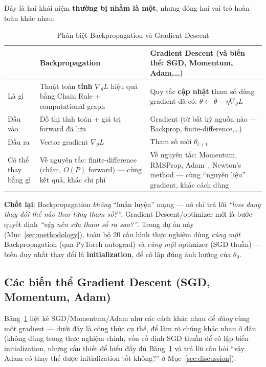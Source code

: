 \documentclass[12pt,a4paper]{article}
\begin{document}
Đây là hai khái niệm \textbf{thường bị nhầm là một}, nhưng đóng hai vai trò
hoàn toàn khác nhau:

\begin{table}[htbp]
\centering
\caption{Phân biệt Backpropagation và Gradient Descent}
\begin{tabular}{@{}p{2.6cm}p{5.7cm}p{6.3cm}@{}}
\toprule
 & \textbf{Backpropagation} & \textbf{Gradient Descent (và biến thể: SGD, Momentum, Adam,\ldots)} \\
\midrule
Là gì & Thuật toán \textbf{tính} $\nabla_\theta L$ hiệu quả bằng Chain Rule + computational graph & Quy tắc \textbf{cập nhật} tham số dùng gradient đã có: $\theta\leftarrow\theta-\eta\nabla_\theta L$ \\
Đầu vào & Đồ thị tính toán + giá trị forward đã lưu & Gradient (từ bất kỳ nguồn nào --- Backprop, finite-difference,\ldots) \\
Đầu ra & Vector gradient $\nabla_\theta L$ & Tham số mới $\theta_{t+1}$ \\
Có thể thay bằng gì & Về nguyên tắc: finite-difference (chậm, $O(P)$ forward) --- cùng kết quả, khác chi phí & Về nguyên tắc: Momentum, RMSProp, Adam~\citep{kingma2015adam}, Newton's method --- cùng ``nguyên liệu'' gradient, khác cách dùng \\
\bottomrule
\end{tabular}
\label{tab:bp_vs_gd}
\end{table}

\textbf{Chốt lại}: Backpropagation \emph{không} ``huấn luyện'' mạng --- nó
chỉ trả lời \emph{``loss đang thay đổi thế nào theo từng tham số?''}.
Gradient Descent/optimizer mới là bước quyết định \emph{``vậy nên sửa tham
số ra sao?''}. Trong dự án này (Mục~\ref{sec:methodology}), toàn bộ 20 cấu
hình thực nghiệm dùng \emph{cùng một} Backpropagation (qua PyTorch autograd)
và \emph{cùng một} optimizer (SGD thuần) --- biến duy nhất thay đổi là
\textbf{initialization}, để cô lập đúng ảnh hưởng của $\theta_0$.

\subsection{Các biến thể Gradient Descent (SGD, Momentum, Adam)}
\label{sec:optimizers}

Bảng~\ref{tab:bp_vs_gd} liệt kê SGD/Momentum/Adam như các cách khác nhau
để \emph{dùng} cùng một gradient --- dưới đây là công thức cụ thể, để làm
rõ chúng khác nhau ở đâu (không dùng trong thực nghiệm chính, vốn cố định
SGD thuần để cô lập biến initialization, nhưng cần thiết để hiểu đầy đủ
Bảng~\ref{tab:bp_vs_gd} và trả lời câu hỏi ``vậy Adam có thay thế được
initialization tốt không?'' ở Mục~\ref{sec:discussion}).
\end{document}
